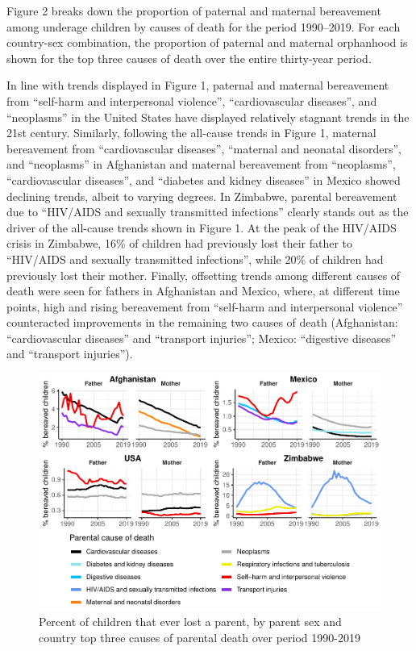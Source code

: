 \documentclass[
  11pt,
  letterpaper,
]{article}
\begin{document}
Figure 2 breaks down the proportion of paternal and maternal bereavement among underage children by causes of death for the period 1990--2019. For each country-sex combination, the proportion of paternal and maternal orphanhood is shown for the top three causes of death over the entire thirty-year period.

In line with trends displayed in Figure 1, paternal and maternal bereavement from ``self-harm and interpersonal violence'', ``cardiovascular diseases'', and ``neoplasms'' in the United States have displayed relatively stagnant trends in the 21st century. Similarly, following the all-cause trends in Figure 1, maternal bereavement from ``cardiovascular diseases'', ``maternal and neonatal disorders'', and ``neoplasms'' in Afghanistan and maternal bereavement from ``neoplasms'', ``cardiovascular diseases'', and ``diabetes and kidney diseases'' in Mexico showed declining trends, albeit to varying degrees. In Zimbabwe, parental bereavement due to ``HIV/AIDS and sexually transmitted infections'' clearly stands out as the driver of the all-cause trends shown in Figure 1. At the peak of the HIV/AIDS crisis in Zimbabwe, 16\% of children had previously lost their father to ``HIV/AIDS and sexually transmitted infections'', while 20\% of children had previously lost their mother. Finally, offsetting trends among different causes of death were seen for fathers in Afghanistan and Mexico, where, at different time points, high and rising bereavement from ``self-harm and interpersonal violence'' counteracted improvements in the remaining two causes of death (Afghanistan: ``cardiovascular diseases'' and ``transport injuries''; Mexico: ``digestive diseases'' and ``transport injuries'').

\begin{figure}
\centering
\includegraphics{parental_loss_global_paa_ext_abstract_files/figure-latex/perc-ber-top-1.pdf}
\caption{\label{fig:perc-ber-top}Percent of children that ever lost a parent, by parent sex and country top three causes of parental death over period 1990-2019}
\end{figure}
\end{document}
